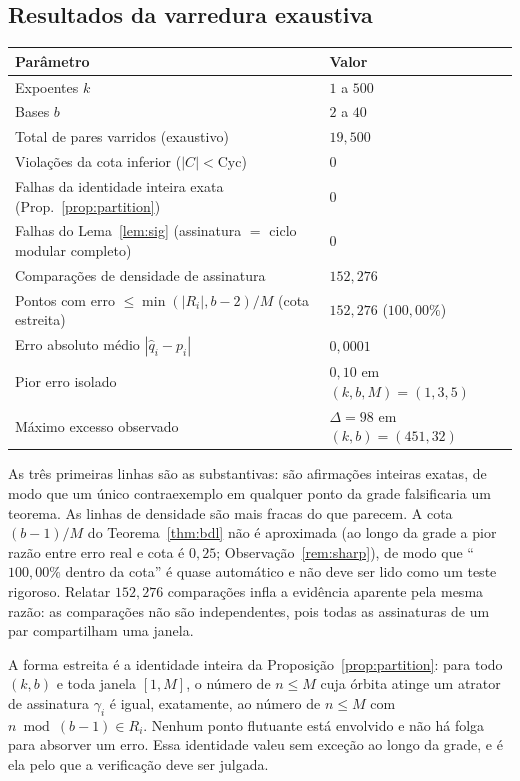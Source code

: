 \documentclass[11pt]{article}
\theoremstyle{definition}
\theoremstyle{remark}
\newcommand{\Cyc}{\mathrm{Cyc}}
\begin{document}
\subsection{Resultados da varredura exaustiva}

\begin{center}
\begin{tabular}{@{}ll@{}}
\toprule
\textbf{Parâmetro} & \textbf{Valor} \\
\midrule
Expoentes $k$ & $1$ a $500$ \\
Bases $b$ & $2$ a $40$ \\
Total de pares varridos (exaustivo) & $19{,}500$ \\
Violações da cota inferior ($|C| < \Cyc$) & $0$ \\
Falhas da identidade inteira exata (Prop.~\ref{prop:partition}) & $0$ \\
Falhas do Lema~\ref{lem:sig} (assinatura $=$ ciclo modular completo) & $0$ \\
Comparações de densidade de assinatura & $152{,}276$ \\
Pontos com erro $\le \min(|R_i|,b-2)/M$ (cota estreita) & $152{,}276$ ($100{,}00\%$) \\
Erro absoluto médio $|\hat q_i - p_i|$ & $0{,}0001$ \\
Pior erro isolado & $0{,}10$ em $(k,b,M) = (1,3,5)$ \\
Máximo excesso observado & $\Delta = 98$ em $(k,b) = (451,32)$ \\
\bottomrule
\end{tabular}
\end{center}

As três primeiras linhas são as substantivas: são afirmações inteiras exatas, de modo que um único contraexemplo em qualquer ponto da grade falsificaria um teorema. As linhas de densidade são mais fracas do que parecem. A cota $(b-1)/M$ do Teorema~\ref{thm:bdl} não é aproximada (ao longo da grade a pior razão entre erro real e cota é $0{,}25$; Observação~\ref{rem:sharp}), de modo que ``$100{,}00\%$ dentro da cota'' é quase automático e não deve ser lido como um teste rigoroso. Relatar $152{,}276$ comparações infla a evidência aparente pela mesma razão: as comparações não são independentes, pois todas as assinaturas de um par compartilham uma janela.

A forma estreita é a identidade inteira da Proposição~\ref{prop:partition}: para todo $(k,b)$ e toda janela $[1,M]$, o número de $n \le M$ cuja órbita atinge um atrator de assinatura $\gamma_i$ é igual, exatamente, ao número de $n \le M$ com $n \bmod (b-1) \in R_i$. Nenhum ponto flutuante está envolvido e não há folga para absorver um erro. Essa identidade valeu sem exceção ao longo da grade, e é ela pelo que a verificação deve ser julgada.
\end{document}
